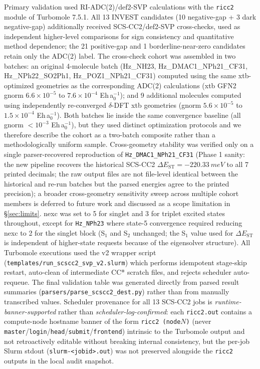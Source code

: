 \documentclass[journal=jcisd8,manuscript=article]{achemso}
\begin{document}
Primary validation used RI-ADC(2)/def2-SVP calculations with the \texttt{ricc2} module of Turbomole 7.5.1.\cite{TURBOMOLE2024} All 13 INVEST candidates (10 negative-gap + 3 dark negative-gap) additionally received SCS-CC2/def2-SVP cross-checks, used as independent higher-level comparisons for sign consistency and quantitative method dependence; the 21 positive-gap and 1 borderline-near-zero candidates retain only the ADC(2) label. The cross-check cohort was assembled in two batches: an original 4-molecule batch (Hz\_NH23, Hz\_DMAC1\_NPh21\_CF31, Hz\_NPh22\_SO2Ph1, Hz\_POZ1\_NPh21\_CF31) computed using the same xtb-optimized geometries as the corresponding ADC(2) calculations (xtb GFN2 gnorm $6.6\!\times\!10^{-5}$ to $7.6\!\times\!10^{-4}$ Eh\,a$_0^{-1}$); and 9 additional molecules computed using independently re-converged $\delta$-DFT xtb geometries (gnorm $5.6\!\times\!10^{-5}$ to $1.5\!\times\!10^{-4}$ Eh\,a$_0^{-1}$). Both batches lie inside the same convergence baseline (all gnorm $<\!10^{-3}$ Eh\,a$_0^{-1}$), but they used distinct optimization protocols and we therefore describe the cohort as a two-batch composite rather than a methodologically uniform sample. Cross-geometry stability was verified only on a single parser-recovered reproduction of \texttt{Hz\_DMAC1\_NPh21\_CF31} (Phase 1 sanity: the new pipeline recovers the historical SCS-CC2 $\Delta E_\mathrm{ST}=-\SI{220.33}{meV}$ to all 7 printed decimals; the raw output files are not file-level identical between the historical and re-run batches but the parsed energies agree to the printed precision); a broader cross-geometry sensitivity sweep across multiple cohort members is deferred to future work and discussed as a scope limitation in \S\ref{sec:limits}. nexc was set to 5 for singlet and 3 for triplet excited states throughout, except for \texttt{Hz\_NPh23} where state-5 convergence required reducing nexc to 2 for the singlet block (S$_1$ and S$_2$ unchanged; the S$_1$ value used for $\Delta E_\mathrm{ST}$ is independent of higher-state requests because of the eigensolver structure). All Turbomole executions used the v2 wrapper script (\texttt{templates/run\_scscc2\_svp\_v2.slurm}) which performs idempotent stage-skip restart, auto-clean of intermediate CC* scratch files, and rejects scheduler auto-requeue. The final validation table was generated directly from parsed result summaries (\texttt{parsers/parse\_scscc2\_dest.py}) rather than from manually transcribed values. Scheduler provenance for all 13 SCS-CC2 jobs is \emph{runtime-banner-supported} rather than \emph{scheduler-log-confirmed}: each \texttt{ricc2.out} contains a compute-node hostname banner of the form \texttt{ricc2 (node$N$)} (never \texttt{master}/\texttt{login}/\texttt{head}/\texttt{submit}/\texttt{frontend}) intrinsic to the Turbomole output and not retroactively editable without breaking internal consistency, but the per-job Slurm stdout (\texttt{slurm-<jobid>.out}) was not preserved alongside the \texttt{ricc2} outputs in the local audit snapshot.
\end{document}
